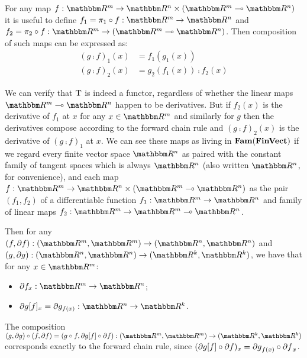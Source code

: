 For any map $f: \RR^m \to \RR^n \times (\RR^m \linearto \RR^n)$ it is useful to define $f_1 = \pi_1 \comp f:
\RR^m \to \RR^n$ and $f_2 = \pi_2 \comp f: \RR^m \to (\RR^m \linearto \RR^n)$. Then composition of such maps
can be expressed as:
\begin{align*}
(g \comp f)_1(x) &= f_1(g_1(x)) \\
(g \comp f)_2(x) &= g_2(f_1(x)) \comp f_2(x)
\end{align*}

We can verify that $\mathrm{T}$ is indeed a functor, regardless of whether the linear maps $\RR^m \linearto
\RR^n$ happen to be derivatives. But if $f_2(x)$ is the derivative of $f_1$ at $x$ for any $x \in \RR^m$ and
similarly for $g$ then the derivatives compose according to the forward chain rule and $(g \comp f)_2(x)$ is
the derivative of $(g \comp f)_1$ at $x$. We can see these maps as living in $\mathbf{Fam}(\mathbf{FinVect})$ if we regard
every finite vector space $\RR^n$ as paired with the constant family of tangent spaces which is always $\RR^n$
(also written $\RR^n$, for convenience), and each map $f: \RR^m \to \RR^n \times (\RR^m \linearto \RR^n)$ as
the pair $(f_1, f_2)$ of a differentiable function $f_1: \RR^m \to \RR^n$ and family of linear maps $f_2:
\RR^m \to \RR^m \linearto \RR^n$.

Then for any $(f, \partial f): (\RR^m, \RR^m) \to (\RR^n, \RR^n)$ and $(g, \partial g): (\RR^n, \RR^n) \to
(\RR^k, \RR^k)$, we have that for any $x \in \RR^m$:
\begin{itemize}
\item $\partial f_x: \RR^m \to \RR^n$;
\item $\reindex{\partial g}{f}_x = \partial g_{f(x)}: \RR^n \to \RR^k$.
\end{itemize}

\noindent The composition $(g, \partial g) \comp (f, \partial f) = (g \comp f, \reindex{\partial g}{f} \comp
\partial f): (\RR^m, \RR^m) \to (\RR^k, \RR^k)$ corresponds exactly to the forward chain rule,
since $(\partial g[f] \circ \partial f)_x = {\partial g}_{f(x)} \circ {\partial f}_x$.

